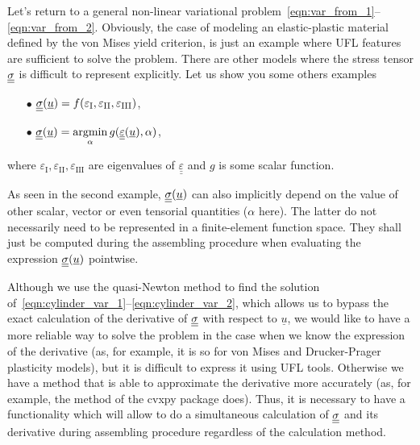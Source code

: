\documentclass[12pt]{article}
\begin{document}
Let's return to a general non-linear variational problem~\eqref{eqn:var_from_1}--\eqref{eqn:var_from_2}. Obviously, the case of modeling an elastic-plastic material defined by the von Mises yield criterion, is just an example where UFL features are sufficient to solve the problem. There are other models where the stress tensor $\underline{\underline{\sigma}}$ is difficult to represent explicitly. Let us show you some others examples

\begin{itemize}
    \item[$\bullet$] $\underline{\underline{\sigma}}(\underline{u}) = f(\varepsilon_\text{I}, \varepsilon_\text{II}, \varepsilon_\text{III})$,
    \item[$\bullet$] $\underline{\underline{\sigma}}(\underline{u}) = \underset{\alpha}{\operatorname{argmin}}\, g(\underline{\underline{\varepsilon}}(\underline{u}),  \alpha)$,
\end{itemize}
where $\varepsilon_\text{I}, \varepsilon_\text{II}, \varepsilon_\text{III}$ are eigenvalues of $\underline{\underline{\varepsilon}}$ and $g$ is some scalar function.




As seen in the second example, $\underline{\underline{\sigma}}(\underline{u})$ can also implicitly depend on the value of other scalar, vector or even tensorial quantities ($\alpha$ here). The latter do not necessarily need to be represented in a finite-element function space. They shall just be computed during the assembling procedure when evaluating the expression $\underline{\underline{\sigma}}(\underline{u})$ pointwise.

Although we use the quasi-Newton method to find the solution of~\eqref{eqn:cylinder_var_1}--\eqref{eqn:cylinder_var_2}, which allows us to bypass the exact calculation of the derivative of $\underline{\underline{\sigma}}$ with respect to $\underline{u}$, we would like to have a more reliable way to solve the problem in the case when we know the expression of the derivative (as, for example, it is so for von Mises and Drucker-Prager plasticity models), but it is difficult to express it using UFL tools. Otherwise we have a method that is able to approximate the derivative more accurately (as, for example, the  method of the cvxpy package does). Thus, it is necessary to have a functionality which will allow to do a simultaneous calculation of $\underline{\underline{\sigma}}$ and its derivative during assembling procedure regardless of the calculation method.
\end{document}
